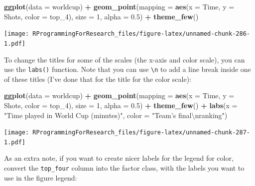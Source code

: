 \documentclass[]{book}
\makeatletter
\newenvironment{Shaded}{\begin{snugshade}}{\end{snugshade}}
\newcommand{\KeywordTok}[1]{\textcolor[rgb]{0.13,0.29,0.53}{\textbf{#1}}}
\newcommand{\DataTypeTok}[1]{\textcolor[rgb]{0.13,0.29,0.53}{#1}}
\newcommand{\DecValTok}[1]{\textcolor[rgb]{0.00,0.00,0.81}{#1}}
\newcommand{\FloatTok}[1]{\textcolor[rgb]{0.00,0.00,0.81}{#1}}
\newcommand{\CharTok}[1]{\textcolor[rgb]{0.31,0.60,0.02}{#1}}
\newcommand{\StringTok}[1]{\textcolor[rgb]{0.31,0.60,0.02}{#1}}
\newcommand{\OperatorTok}[1]{\textcolor[rgb]{0.81,0.36,0.00}{\textbf{#1}}}
\newcommand{\NormalTok}[1]{#1}
\newenvironment{kframe}{%
\medskip{}
\setlength{\fboxsep}{.8em}
 \def\at@end@of@kframe{}%
 \ifinner\ifhmode%
  \def\at@end@of@kframe{\end{minipage}}%
  \begin{minipage}{\columnwidth}%
 \fi\fi%
 \def\FrameCommand##1{\hskip\@totalleftmargin \hskip-\fboxsep
 \colorbox{shadecolor}{##1}\hskip-\fboxsep
     \hskip-\linewidth \hskip-\@totalleftmargin \hskip\columnwidth}%
 \MakeFramed {\advance\hsize-\width
   \@totalleftmargin\z@ \linewidth\hsize
   \@setminipage}}%
 {\par\unskip\endMakeFramed%
 \at@end@of@kframe}
\renewenvironment{Shaded}{\begin{kframe}}{\end{kframe}}
\theoremstyle{definition}
\theoremstyle{definition}
\theoremstyle{definition}
\theoremstyle{remark}
\makeatother
\begin{document}
\begin{Shaded}
\begin{Highlighting}[]
\KeywordTok{ggplot}\NormalTok{(}\DataTypeTok{data =}\NormalTok{ worldcup) }\OperatorTok{+}
\StringTok{  }\KeywordTok{geom_point}\NormalTok{(}\DataTypeTok{mapping =} \KeywordTok{aes}\NormalTok{(}\DataTypeTok{x =}\NormalTok{ Time, }\DataTypeTok{y =}\NormalTok{ Shots, }\DataTypeTok{color =}\NormalTok{ top_}\DecValTok{4}\NormalTok{),}
             \DataTypeTok{size =} \DecValTok{1}\NormalTok{, }\DataTypeTok{alpha =} \FloatTok{0.5}\NormalTok{) }\OperatorTok{+}\StringTok{ }
\StringTok{  }\KeywordTok{theme_few}\NormalTok{()}
\end{Highlighting}
\end{Shaded}

\texttt{[image: RProgrammingForResearch\_files/figure-latex/unnamed-chunk-286-1.pdf]}

To change the titles for some of the scales (the x-axis and color
scale), you can use the \texttt{labs()} function. Note that you can use
\texttt{\textbackslash{}n} to add a line break inside one of these
titles (I've done that for the title for the color scale):

\begin{Shaded}
\begin{Highlighting}[]
\KeywordTok{ggplot}\NormalTok{(}\DataTypeTok{data =}\NormalTok{ worldcup) }\OperatorTok{+}
\StringTok{  }\KeywordTok{geom_point}\NormalTok{(}\DataTypeTok{mapping =} \KeywordTok{aes}\NormalTok{(}\DataTypeTok{x =}\NormalTok{ Time, }\DataTypeTok{y =}\NormalTok{ Shots, }\DataTypeTok{color =}\NormalTok{ top_}\DecValTok{4}\NormalTok{),}
             \DataTypeTok{size =} \DecValTok{1}\NormalTok{, }\DataTypeTok{alpha =} \FloatTok{0.5}\NormalTok{) }\OperatorTok{+}\StringTok{ }
\StringTok{  }\KeywordTok{theme_few}\NormalTok{() }\OperatorTok{+}\StringTok{ }
\StringTok{  }\KeywordTok{labs}\NormalTok{(}\DataTypeTok{x =} \StringTok{"Time played in World Cup (minutes)"}\NormalTok{,}
       \DataTypeTok{color =} \StringTok{"Team's final}\CharTok{\textbackslash{}n}\StringTok{ranking"}\NormalTok{)}
\end{Highlighting}
\end{Shaded}

\texttt{[image: RProgrammingForResearch\_files/figure-latex/unnamed-chunk-287-1.pdf]}

As an extra note, if you want to create nicer labels for the legend for
color, convert the \texttt{top\_four} column into the factor class, with
the labels you want to use in the figure legend:
\end{document}
